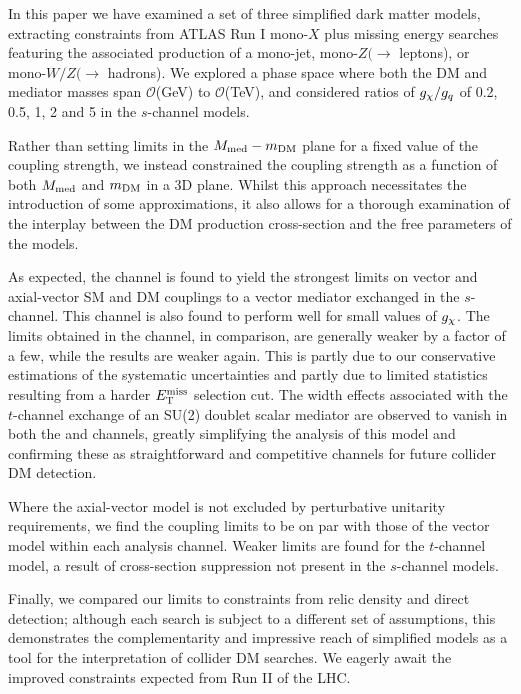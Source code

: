 In this paper we have examined a set of three simplified dark matter models, extracting constraints from ATLAS Run I mono-$X$ plus missing energy searches featuring the associated production of a mono-jet, mono-$Z(\rightarrow$ leptons), or mono-$W/Z (\rightarrow$ hadrons). We explored a phase space where both the DM and mediator masses span $\mathcal{O}$(GeV) to $\mathcal{O}$(TeV), and considered ratios of $g_{\chi} / g_q$ of 0.2, 0.5, 1, 2 and 5 in the $s$-channel models.

Rather than setting limits in the $M_{\mathrm{med}} - m_{\mathrm{DM}}$ plane for a fixed value of the coupling strength, we instead constrained the coupling strength as a function of both $M_{\mathrm{med}}$ and $m_{\mathrm{DM}}$ in a 3D plane. Whilst this approach necessitates the introduction of some approximations, it also allows for a thorough examination of the interplay between the DM production cross-section and the free parameters of the models.

As expected, the \monojet channel is found to yield the strongest limits on vector and axial-vector SM and DM couplings to a vector mediator exchanged in the $s$-channel. This channel is also found to perform well for small values of $g_{\chi}$. The limits obtained in the \monoZ channel, in comparison, are generally weaker by a factor of a few, while the \monoWZ results are weaker again. This is partly due to our conservative estimations of the systematic uncertainties and partly due to limited statistics resulting from a harder $E_{\mathrm{T}}^{\mathrm{miss}}$ selection cut. The width effects associated with the $t$-channel exchange of an SU(2) doublet scalar mediator are observed to vanish in both the \monoZ and \monoWZ channels, greatly simplifying the analysis of this model and confirming these as straightforward and competitive channels for future collider DM detection.

Where the axial-vector model is not excluded by perturbative unitarity requirements, we find the coupling limits to be on par with those of the vector model within each analysis channel. Weaker limits are found for the $t$-channel model, a result of cross-section suppression not present in the $s$-channel models.

Finally, we compared our limits to constraints from relic density and direct detection; although each search is subject to a different set of assumptions, this demonstrates the complementarity and impressive reach of simplified models as a tool for the interpretation of collider DM searches. We eagerly await the improved constraints expected from Run II of the LHC.
